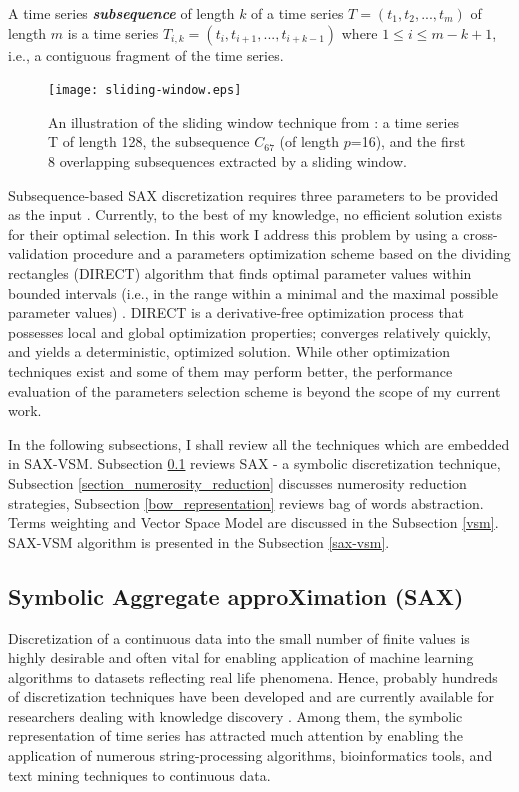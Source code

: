 A time series \textbf{\textit{subsequence}} of length $k$ of a time series $T = (t_{1}, t_{2},...,t_{m})$ of length $m$ is a time 
series $T_{i,k} = (t_{i},t_{i+1},...,t_{i+k-1})$  where $1 \leq i \leq m - k + 1$, i.e., a contiguous fragment of the time series.

\begin{figure}[t]
   \centering
   \texttt{[image: sliding-window.eps]}
   \caption[An illustration of the time series symbolic discretization via sliding window.]
   {An illustration of the sliding window technique from \cite{citeulike:2821475}: a time series T of length 128, 
   the subsequence $C_{67}$ (of length $p$=16), and the first 8 overlapping subsequences extracted by a sliding window.}
   \label{fig:sliding_window}
\end{figure}

Subsequence-based SAX discretization requires three parameters to be provided as the input \cite{citeulike:2821475}. 
Currently, to the best of my knowledge, no efficient solution exists for their optimal selection. 
In this work I address this problem by using a cross-validation procedure and a parameters optimization scheme based on the dividing 
rectangles (DIRECT) algorithm that finds optimal parameter values within bounded intervals (i.e., in the range within a minimal and the maximal possible parameter values) \cite{citeulike:12563460}. 
DIRECT is a derivative-free optimization process that possesses local and global optimization properties; converges relatively quickly, and yields a deterministic, optimized solution. While other optimization techniques exist and some of them may perform better, the performance evaluation of the parameters selection scheme is beyond the scope of my current work.

In the following subsections, I shall review all the techniques which are embedded in SAX-VSM. 
Subsection \ref{section-sax} reviews SAX - a symbolic discretization technique, 
Subsection \ref{section_numerosity_reduction} discusses numerosity reduction strategies,
Subsection \ref{bow_representation} reviews bag of words abstraction.
Terms weighting and Vector Space Model are discussed in the Subsection \ref{vsm}. 
SAX-VSM algorithm is presented in the Subsection \ref{sax-vsm}. 


\subsection{Symbolic Aggregate approXimation (SAX)}\label{section-sax}
Discretization of a continuous data into the small number of finite values is highly desirable and often vital for enabling application of machine learning algorithms to datasets reflecting real life phenomena. Hence, probably hundreds of discretization techniques have been developed and are currently available for researchers dealing with knowledge discovery \cite{citeulike:12394286}. Among them, the symbolic representation of time series has attracted much attention by enabling the application of numerous string-processing algorithms, bioinformatics tools, and text mining techniques to continuous data.

